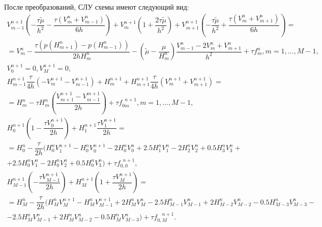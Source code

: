 \documentclass[12pt,a4paper]{article}
\begin{document}
После преобразований, СЛУ схемы имеют следующий вид:
\begin{gather*}
    V_{m-1}^{n+1}\left(-\dfrac{\tau\tilde{\mu}}{h^2}-\dfrac{\tau(V_{m}^n + V_{m-1}^n)}{6h}\right) + 
    V_{m}^{n+1}\left(1+\dfrac{2\tau\tilde{\mu}}{h^2}\right) +
    V_{m+1}^{n+1}\left(-\dfrac{\tau\tilde{\mu}}{h^2}+\dfrac{\tau(V_{m}^{n} + V_{m+1}^{n})}{6h} \right)= \\ =
    V_{m}^n-\dfrac{\tau(p(H_{m+1}^{n}) - p(H_{m-1}^n))}{2hH_m^n} -
    \left( \tilde{\mu} - \dfrac{\mu}{H_m^n} \right) \dfrac{V_{m-1}^n - 2V_{m}^n + V_{m+1}^n}{h^2} + \tau f_m^{n}
    , m = 1,\dots, M-1,\\
    V_0^{n+1} = 0, V_M^{n+1} = 0, \\
    H_{m-1}^{n+1}\dfrac{\tau}{4h}(-V_{m}^{n+1} - V_{m-1}^{n+1}) +
    H_{m}^{n+1} +
    H_{m+1}^{n+1}\dfrac{\tau}{4h}(V_{m}^{n+1} + V_{m+1}^{n+1}) = \\
    = H_{m}^{n} - \tau H_{m}^{n}\left( \dfrac{V_{m+1}^{n+1} - V_{m-1}^{m+1}}{2h} \right) + \tau f_{0m}^{\phantom{0}n+1}
    , m = 1,\dots, M-1,\\
    H_0^{n+1}\left( 1 - \dfrac{\tau V_0^{n+1}}{2h} \right) + H_1^{n+1}\dfrac{\tau V_1^{n+1}}{2h} = \\
    = H_0^{n} - \dfrac{\tau}{2h}(H_0^nV_1^{n+1} - H_0^nV_0^{n+1} - 2H_0^nV_0^n + 2.5H_1^nV_1^n - 2H_2^nV_2^n + 0.5H_3^nV_3^n + \\
    + 2.5H_0^nV_1^n - 2H_0^nV_2^n + 0.5H_0^nV_3^n) + \tau f_{0,0}^{\phantom{0}n+1}, \\
    H_{M-1}^{n+1}\left(-\dfrac{\tau V_{M-1}^{n+1}}{2h}\right) + H_M^{n+1}\left(1 + \dfrac{\tau V_M^{n+1}}{2h}\right) = \\
    = H_M^{n} - \dfrac{\tau}{2h}(H_M^nV_M^{n+1} - H_M^nV_{M-1}^{n+1} + 2H_M^nV_M^n - 2.5H_{M-1}^nV_{M-1}^n + 2H_{M-2}^nV_{M-2}^n - 0.5H_{M-3}^nV_{M-3}^n - \\
    - 2.5H_M^nV_{M-1}^n + 2H_M^nV_{M-2}^n - 0.5H_M^nV_{M-3}^n) + \tau f_{0,M}^{\phantom{0,}n+1}.
\end{gather*}








\end{document}
